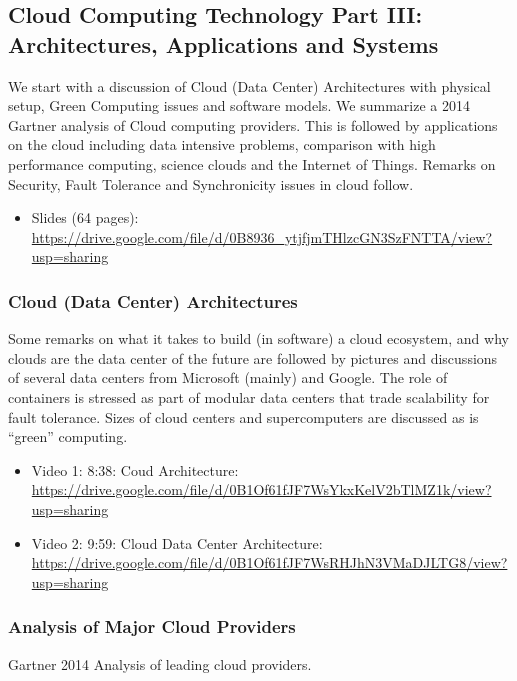 \subsection{Cloud Computing Technology Part III: Architectures,  Applications and Systems}

We start with a discussion of Cloud (Data Center) Architectures with
physical setup, Green Computing issues and software models. We summarize
a 2014 Gartner analysis of Cloud computing providers. This is followed
by applications on the cloud including data intensive problems,
comparison with high performance computing, science clouds and the
Internet of Things. Remarks on Security, Fault Tolerance and
Synchronicity issues in cloud follow.

\begin{itemize}
\item
  Slides (64 pages):
  \url{https://drive.google.com/file/d/0B8936_ytjfjmTHlzcGN3SzFNTTA/view?usp=sharing}
\end{itemize}

\subsubsection{Cloud (Data Center) Architectures}

Some remarks on what it takes to build (in software) a cloud ecosystem,
and why clouds are the data center of the future are followed by
pictures and discussions of several data centers from Microsoft (mainly)
and Google. The role of containers is stressed as part of modular data
centers that trade scalability for fault tolerance. Sizes of cloud
centers and supercomputers are discussed as is ``green'' computing.

\begin{itemize}
\item
  Video 1: 8:38: Coud Architecture:
  \url{https://drive.google.com/file/d/0B1Of61fJF7WsYkxKelV2bTlMZ1k/view?usp=sharing}
\item
  Video 2: 9:59: Cloud Data Center Architecture:
  \url{https://drive.google.com/file/d/0B1Of61fJF7WsRHJhN3VMaDJLTG8/view?usp=sharing}
\end{itemize}

\subsubsection{Analysis of Major Cloud Providers}\label{analysis-of-major-cloud-providers}

Gartner 2014 Analysis of leading cloud providers.

